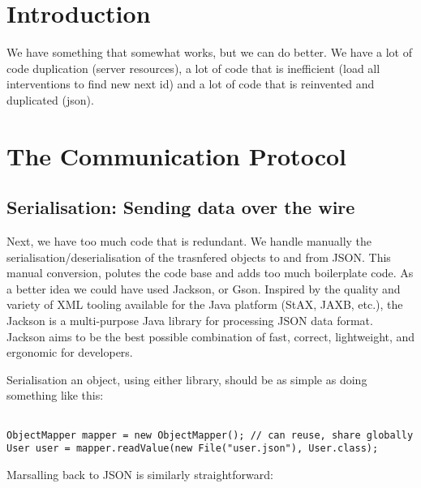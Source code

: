 \documentclass[12pt]{scrartcl}
\begin{document}
\maketitle

\begin{abstract}
\end{abstract}

\tableofcontents

\section*{Introduction}

We have something that somewhat works, but we can do better. We have a lot of code duplication (server resources), a lot of code that is inefficient (load all interventions to find new next id) and a lot of code that is reinvented and duplicated (json).

\section{The Communication Protocol}

\subsection{Serialisation: Sending data over the wire} 

Next, we have too much code that is redundant. We handle manually the serialisation/deserialisation of the trasnfered objects to and from JSON. This manual conversion, polutes the code base and adds too much boilerplate code. As a better idea we could have used Jackson, or Gson. Inspired by the quality and variety of XML tooling available for the Java platform (StAX, JAXB, etc.), the Jackson is a multi-purpose Java library for processing JSON data format. Jackson aims to be the best possible combination of fast, correct, lightweight, and ergonomic for developers.

Serialisation an object, using either library, should be as simple as doing something like this:

\begin{lstlisting}

ObjectMapper mapper = new ObjectMapper(); // can reuse, share globally
User user = mapper.readValue(new File("user.json"), User.class);

\end{lstlisting}

Marsalling back to JSON is similarly straightforward:
\end{document}
